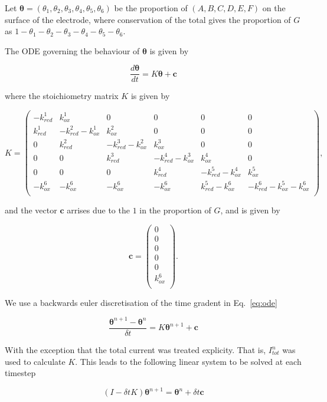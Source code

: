 \documentclass[a4paper, 12pt]{article}
\begin{document}
Let $\bm{\theta} = (\theta_1,\theta_2,\theta_3,\theta_4,\theta_5,\theta_6)$ be 
the proportion of $(A,B,C,D,E,F)$ on the surface of the electrode, where 
conservation of the total gives the proportion of $G$ as 
$1-\theta_1-\theta_2-\theta_3-\theta_4-\theta_5-\theta_6$. 

The ODE governing the behaviour of $\bm{\theta}$ is given by

$$
\label{eq:ode}
\frac{d\bm{\theta}}{dt} = K \bm{\theta} + \mathbf{c}
$$

where the stoichiometry matrix $K$ is given by

$$
K = \begin{pmatrix}
    - k^1_{red} & k^1_{ox} & 0 & 0 & 0 & 0 \\
      k^1_{red} & -k^2_{red}-k^1_{ox} & k^2_{ox} & 0 & 0 & 0 \\
      0 & k^2_{red} & -k^3_{red}-k^2_{ox} & k^3_{ox} & 0 & 0 \\
      0 & 0 & k^3_{red} & -k^4_{red}-k^3_{ox} &  k^4_{ox} & 0 \\
      0 & 0 & 0 & k^4_{red} & -k^5_{red}-k^4_{ox} & k^5_{ox} \\
      -k^6_{ox} & -k^6_{ox} & -k^6_{ox} & -k^6_{ox} & k^5_{red} -k^6_{ox}& 
      -k^6_{red}-k^5_{ox} -k^6_{ox}\\
\end{pmatrix},
$$

and the vector $\mathbf{c}$ arrises due to the $1$ in the proportion of $G$, and 
is given by

$$
\mathbf{c} = \begin{pmatrix}
    0 \\
    0 \\
    0 \\
    0 \\
    0 \\
    k^6_{ox} \\
\end{pmatrix}.
$$

We use a backwards euler discretisation of the time gradent in Eq.~\ref{eq:ode}

$$
\frac{\bm{\theta}^{n+1} - \bm{\theta}^{n}}{\delta t} = K \bm{\theta}^{n+1} +
\mathbf{c}
$$

With the exception that the total current was treated explicity. That is, 
$I_{tot}^n$ was used to calculate $K$. This leads to the following linear system 
to be solved at each timestep

$$
(I - \delta t K)\bm{\theta}^{n+1} = \bm{\theta}^n + \delta t \mathbf{c}
$$
\end{document}
